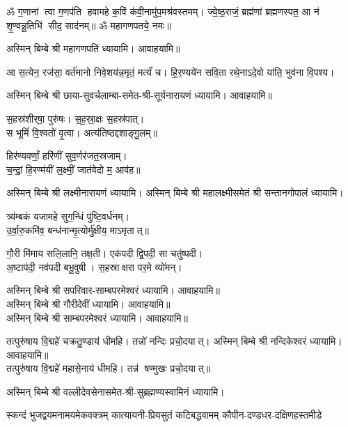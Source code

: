 





\begin{center}


ॐ ग॒णानां त्वा ग॒णप॑ति हवामहे क॒विं क॑वी॒नामु॑प॒मश्र॑\-वस्तमम्। 
ज्ये॒ष्ठ॒राजं॒ ब्रह्म॑णां ब्रह्मणस्पत॒ आ न॑ शृ॒ण्वन्नू॒तिभि॑ सीद॒ साद॑नम्॥ 
ॐ महागणपतये॒ नमः॥ 

अस्मिन् बिम्बे श्री महागणपतिं ध्यायामि। आवाहयामि॥

आ स॒त्येन॒ रज॑सा॒ वर्त॑मानो निवे॒शय॑न्न॒मृतं॒ मर्त्यं॑ च। हि॒र॒ण्यये॑न सवि॒ता रथे॒नाऽदे॒वो या॑ति॒ भुव॑ना वि॒पश्य\sn{}।

अस्मिन् बिम्बे श्री छाया-सुवर्चलाम्बा-समेत-श्री-सूर्यनारायणं ध्यायामि। आवाहयामि॥


स॒हस्र॑शीर्‌षा॒ पुरु॑षः। स॒ह॒स्रा॒क्षः स॒हस्र॑पात्।\\
स भूमिं॑ वि॒श्वतो॑ वृ॒त्वा। अत्य॑तिष्ठद्दशाङ्गु॒लम्॥

हिर॑ण्यवर्णां॒ हरि॑णीं सुव॒र्णर॑जत॒स्रजाम्।\\
च॒न्द्रां॒ हि॒रण्म॑यीं ल॒क्ष्मीं॒ जात॑वेदो म॒ आव॑ह॥

अस्मिन् बिम्बे श्री लक्ष्मीनारायणं ध्यायामि।
अस्मिन् बिम्बे श्री महालक्ष्मीसमेतं श्री सन्तानगोपालं ध्यायामि।

त्र्य॑म्बकं यजामहे सुग॒न्धिं पु॑ष्टि॒वर्ध॑नम्।\\
उ॒र्वा॒रु॒कमि॑व॒ बन्ध॑नान्मृ॒त्योर्मु॑क्षीय॒ माऽमृतात्॥

गौ॒री मि॑माय सलि॒लानि॒ तक्ष॒ती। एक॑पदी द्वि॒पदी॒ सा चतु॑ष्पदी।\\
अ॒ष्टाप॑दी॒ नव॑पदी बभू॒वुषी। स॒हस्राक्षरा पर॒मे व्यो॑मन्।

अस्मिन् बिम्बे श्री सपरिवार-साम्बपरमेश्वरं ध्यायामि। आवाहयामि॥\\
अस्मिन् बिम्बे श्री गौरीदेवीं ध्यायामि। आवाहयामि॥\\
अस्मिन् बिम्बे श्री साम्बपरमेश्वरं ध्यायामि। आवाहयामि॥

तत्पुरु॑षाय वि॒द्महे॑ चक्रतु॒ण्डाय॑ धीमहि। तन्नो॑ नन्दिः प्रचो॒दयात्। 
अस्मिन् बिम्बे श्री नन्दिकेश्वरं ध्यायामि। आवाहयामि॥\\

तत्पुरु॑षाय वि॒द्महे॑ महासे॒नाय॑ धीमहि। तन्न॑ षण्मुखः प्रचो॒दयात्॥

अस्मिन् बिम्बे श्री वल्लीदेवसेनासमेत-श्री-सुब्रह्मण्यस्वामिनं ध्यायामि। 

{स्कन्दं भुजद्वयमनामयमेकवक्त्रम्}
{कात्यायनी-प्रियसुतं कटिबद्धवामम्}
{कौपीन-दण्डधर-दक्षिणहस्तमीडे}


\end{center}
